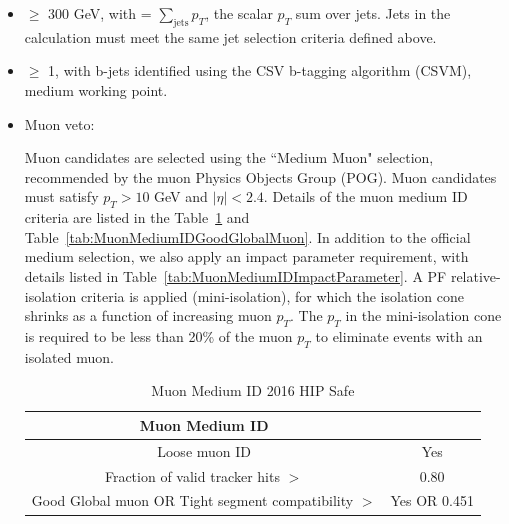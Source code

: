 \begin{itemize}
\item \HT $\ge$ 300 GeV, with \HT = $\sum_{\mathrm{jets}} p_{T}$, the scalar $p_{T}$ sum over jets. Jets in the \HT calculation must meet the same jet selection criteria defined above.

\item \nbjets $\ge$ 1, with b-jets identified using the CSV b-tagging algorithm (CSVM), medium working point.

\item Muon veto:

Muon candidates are selected using the ``Medium Muon" selection, recommended by the muon Physics Objects Group (POG). Muon candidates must satisfy $p_{T}>10$ GeV and $|\eta|<2.4$. Details of the muon medium ID criteria are listed in the Table~\ref{tab:MuonMediumID} and Table~\ref{tab:MuonMediumIDGoodGlobalMuon}. In addition to the official medium selection, we also apply an impact parameter requirement, with details listed in Table~\ref{tab:MuonMediumIDImpactParameter}. A PF relative-isolation criteria is applied (mini-isolation), for which the isolation cone shrinks as a function of increasing muon $p_{T}$. The $p_{T}$ in the mini-isolation cone is required to be less than 20\% of the muon $p_{T}$ to eliminate events with an isolated muon. 

\newsavebox{\closureBox}

\begin{table}[htbp]
\fontsize{10 pt}{1.2 em}
\selectfont
\begin{centering}
\caption{\label{tab:MuonMediumID} Muon Medium ID 2016 HIP Safe}
\hspace*{-4ex}
\begin{lrbox}{\closureBox}
\begin{tabular}{|c|c|}
\hline
  Muon Medium ID                                      &               \\
\hline
  Loose muon ID                                       & Yes           \\
\hline
  Fraction of valid tracker hits $>$                  & 0.80          \\
\hline
  Good Global muon OR Tight segment compatibility $>$ & Yes OR 0.451 \\
\hline
\end{tabular}
\end{lrbox}
\scalebox{0.80}{\usebox{\closureBox}}
\par\end{centering}
\end{table}


\end{itemize}
